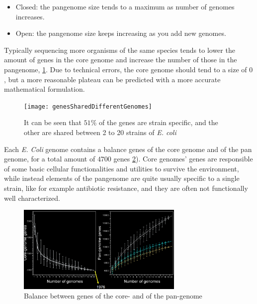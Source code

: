     \begin{multicols}{2}
        \begin{itemize}
            \item Closed: the pangenome size tends to a maximum as number of genomes increases.
            \item Open: the pangenome size keeps increasing as you add new genomes.
        \end{itemize}
    \end{multicols}

    Typically sequencing more organisms of the same species tends to lower the amount of genes in the core genome and increase the number of those in the pangenome, \ref{corepangenome}.
    Due to technical errors, the core genome should tend to a size of $0$, but a more reasonable plateau can be predicted with a more accurate mathematical formulation.

    \begin{figure}[h]
    \centering
    \texttt{[image: genesSharedDifferentGenomes]}
    \caption{It can be seen that $51\%$ of the genes are strain specific, and the other are shared between 2 to 20 strains of \emph{E. coli}}
    \label{corepangenome}
    \end{figure}

    Each \emph{E. Coli} genome contains a balance genes of the core genome and of the pan genome, for a total amount of $4700$ genes \ref{balancepancore}).
    Core genomes' genes are responsible of some basic cellular functionalities and utilities to survive the environment, while instead elements of the pangenome are quite usually specific to a single strain, like for example antibiotic resistance, and they are often not functionally well characterized.

    \begin{figure}[h]
    \centering
    \includegraphics[width=8cm]{corePanGenEcoli}
    \caption{Balance between genes of the core- and of the pan-genome}
    \label{balancepancore}
    \end{figure}

